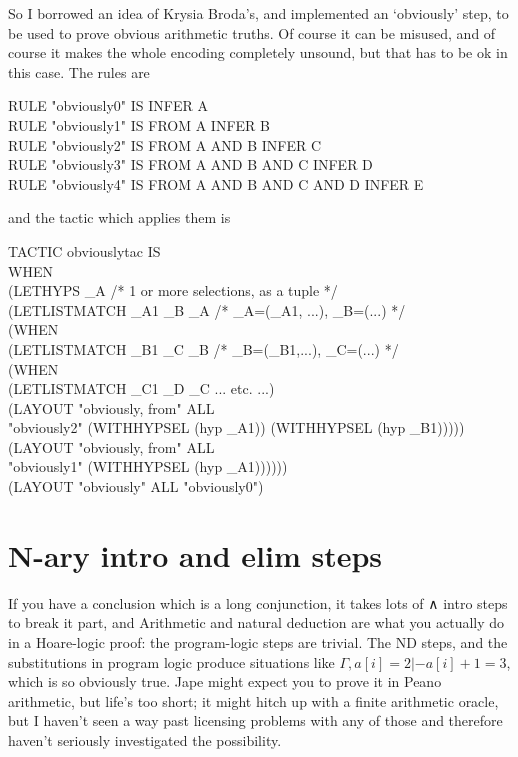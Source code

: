 So I borrowed an idea of Krysia Broda's, and implemented an `obviously' step, to be used to prove obvious arithmetic truths. Of course it can be misused, and of course it makes the whole encoding completely unsound, but that has to be ok in this case. The rules are
\begin{japeish}
RULE "obviously0" IS INFER A  \\
RULE "obviously1" IS FROM A INFER B  \\
RULE "obviously2" IS FROM A AND B INFER C  \\
RULE "obviously3" IS FROM A AND B AND C INFER D  \\
RULE "obviously4" IS FROM A AND B AND C AND D INFER E 
\end{japeish}
and the tactic which applies them is
\begin{japeish}
TACTIC obviouslytac IS \\
\tab WHEN \\
\tab (LETHYPS \_A /* 1 or more selections, as a tuple */ \\
\tab \tab (LETLISTMATCH \_A1 \_B \_A /* \_A=(\_A1, ...), \_B=(...) */ \\
\tab \tab \tab (WHEN \\
\tab \tab \tab \tab (LETLISTMATCH \_B1 \_C \_B /* \_B=(\_B1,...), \_C=(...) */ \\
\tab \tab \tab \tab \tab (WHEN \\
\tab \tab \tab \tab \tab \tab (LETLISTMATCH \_C1 \_D \_C ... etc. ...)\\
\tab \tab \tab \tab \tab \tab (LAYOUT "obviously, from" ALL \\
\tab \tab \tab \tab \tab \tab \tab "obviously2" (WITHHYPSEL (hyp \_A1)) (WITHHYPSEL (hyp \_B1))))) \\
\tab \tab \tab \tab (LAYOUT "obviously, from" ALL \\
\tab \tab \tab \tab \tab "obviously1" (WITHHYPSEL (hyp \_A1)))))) \\
\tab (LAYOUT "obviously" ALL "obviously0")
\end{japeish}

\section{N-ary intro and elim steps}

If you have a conclusion which is a long conjunction, it takes lots of ∧ intro steps to break it part, and 
Arithmetic and natural deduction are what you actually do in a Hoare-logic proof: the program-logic steps are trivial. The ND steps, and the substitutions in program logic produce situations like $\Gamma, a[i]=2 |- a[i]+1=3$, which is so obviously true. Jape might expect you to prove it in Peano arithmetic, but life's too short; it might hitch up with a finite arithmetic oracle, but I haven't seen a way past licensing problems with any of those and therefore haven't seriously investigated the possibility.

